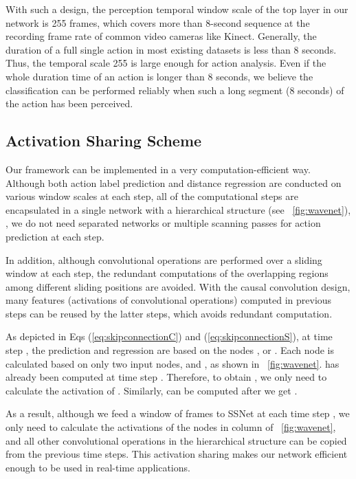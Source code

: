 \documentclass[10pt,twocolumn,letterpaper]{article}
\begin{document}
With such a design, the perception temporal window scale of the top layer in our network is 255 frames,
which covers more than 8-second sequence at the recording frame rate of common video cameras like Kinect.
Generally, the duration of a full single action in most existing datasets is less than 8 seconds.
Thus, the temporal scale 255 is large enough for action analysis.
Even if the whole duration time of an action is longer than 8 seconds,
we believe the classification can be performed reliably when such a long segment (8 seconds) of the action has been perceived.











\subsection{Activation Sharing Scheme}
\label{sec:method:activationshare}



Our framework can be implemented in a very computation-efficient way.
Although both action label prediction and distance regression are conducted on various window scales at each step,
all of the computational steps are encapsulated in a single network with a hierarchical structure
(see \figurename{~\ref{fig:wavenet}}),
\ie, we do not need separated networks or multiple scanning passes for action prediction at each step. 

In addition, although convolutional operations are performed over a sliding window at each step,
the redundant computations of the overlapping regions among different sliding positions are avoided.
With the causal convolution design,
many features (activations of convolutional operations)
computed in previous steps can be reused by the latter steps,
which avoids redundant computation.

As depicted in Eqs (\ref{eq:skipconnectionC}) and (\ref{eq:skipconnectionS}),
at time step , the prediction and regression are based on the nodes ,
 or .
Each node  is calculated based on only two input nodes,
 and , as shown in \figurename{~\ref{fig:wavenet}}.
 has already been computed at time step .
Therefore, to obtain , we only need to calculate the activation of .
Similarly,  can be computed after we get .

As a result, although we feed a window of frames to SSNet at each time step ,
we only need to calculate the activations of the nodes in column  of \figurename{~\ref{fig:wavenet}},
and all other convolutional operations in the hierarchical structure can be copied from the previous time steps.
This activation sharing makes our network efficient enough to be used in real-time applications.
\end{document}
